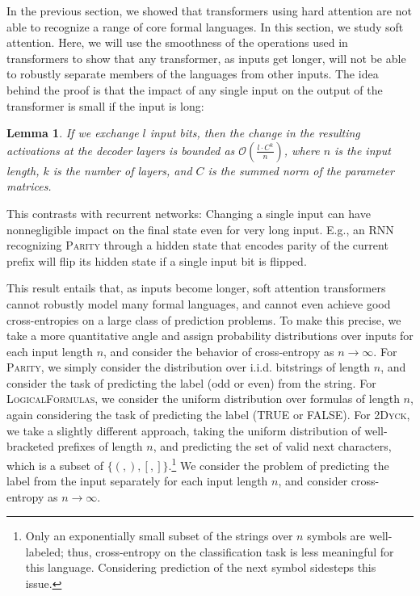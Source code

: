 \documentclass[11pt,a4paper]{article}
\newcounter{theorem}
\newtheorem{lemma}[theorem]{Lemma}
\begin{document}
In the previous section, we showed that transformers using hard attention are not able to recognize a range of core formal languages.
In this section, we study soft attention. %
Here, we will use the smoothness of the operations used in transformers to show that any transformer, as inputs get longer, will not be able to robustly separate members of the languages from other inputs.
The idea behind the proof is that the impact of any single input on the output of the transformer is small if the input is long:
\begin{lemma}
If we exchange $l$ input bits, %
then the change in the resulting activations at the decoder layers is bounded as $\mathcal{O}(\frac{l\cdot C^k}{n})$, where $n$ is the input length, $k$ is the number of layers, and $C$ is the summed norm of the parameter matrices.
\end{lemma}
This contrasts with recurrent networks:
Changing a single input can have nonnegligible impact on the final state even for very long input.
E.g., an RNN recognizing \textsc{Parity} through a hidden state that encodes parity of the current prefix will flip its hidden state if a single input bit is flipped.


This result entails that, as inputs become longer, soft attention transformers cannot robustly model many formal languages, and cannot even achieve good cross-entropies on a large class of prediction problems.
To make this precise, we take a more quantitative angle and assign probability distributions over inputs for each input length $n$, and consider the behavior of cross-entropy as $n\rightarrow\infty$.
For \textsc{Parity}, we simply consider the distribution over i.i.d. bitstrings of length $n$, and consider the task of predicting the label (odd or even) from the string.
For \textsc{LogicalFormulas}, we consider the uniform distribution over formulas of length $n$, again considering the task of predicting the label (TRUE or FALSE).
For \textsc{2Dyck}, we take a slightly different approach, taking the uniform distribution of well-bracketed prefixes of length $n$, and predicting the set of valid next characters, which is a subset of $\{(,),[, ]\}$.\footnote{Only an exponentially small subset of the strings over $n$ symbols are well-labeled; thus, cross-entropy on the classification task is less meaningful for this language. Considering prediction of the next symbol sidesteps this issue.}
We consider the problem of predicting the label from the input separately for each input length $n$, and consider cross-entropy as $n\rightarrow \infty$.
\end{document}
